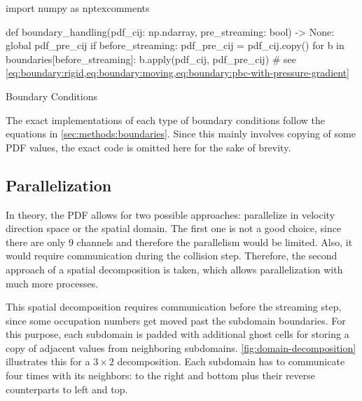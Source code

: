 \begin{listing}[ht!]
    \def\bdryref{\cref{eq:boundary:rigid,eq:boundary:moving,eq:boundary:pbc-with-pressure-gradient}}
    \begin{pycode}
        import numpy as nptexcomments

        def boundary_handling(pdf_cij: np.ndarray, pre_streaming: bool) -> None:
            global pdf_pre_cij
            if before_streaming:
                pdf_pre_cij = pdf_cij.copy()
            for b in boundaries[before_streaming]:
                b.apply(pdf_cij, pdf_pre_cij)  # see \bdryref
    \end{pycode}
    \caption{Boundary Conditions}
    \label{code:boundaries}
\end{listing}

The exact implementations of each type of boundary conditions follow the equations in \cref{sec:methods:boundaries}. Since this mainly involves copying of some \gls{PDF} values, the exact code is omitted here for the sake of brevity.

\subsection{Parallelization}
\label{sec:implementation:parallelization}

In theory, the \gls{PDF} allows for two possible approaches: parallelize in velocity direction space or the spatial domain. The first one is not a good choice, since there are only 9 channels and therefore the parallelism would be limited. Also, it would require communication during the collision step. Therefore, the second approach of a spatial decomposition is taken, which allows parallelization with much more processes.

This spatial decomposition requires communication before the streaming step, since some occupation numbers get moved past the subdomain boundaries. For this purpose, each subdomain is padded with additional ghost cells for storing a copy of adjacent values from neighboring subdomains. \cref{fig:domain-decomposition} illustrates this for a $3\times2$ decomposition. Each subdomain has to communicate four times with its neighbors: to the right and bottom plus their reverse counterparts to left and top.

